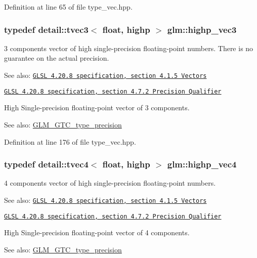 Definition at line 65 of file type\_\-vec.hpp.\hypertarget{group__core__precision_g4879124da7a18d6b681d933cb8c4267d}{
\subsubsection[highp\_\-vec3]{\setlength{\rightskip}{0pt plus 5cm}typedef detail::tvec3$<$ float, highp $>$ {\bf glm::highp\_\-vec3}}}
\label{group__core__precision_g4879124da7a18d6b681d933cb8c4267d}


3 components vector of high single-precision floating-point numbers. There is no guarantee on the actual precision.

\begin{Desc}
\item[See also:]\href{http://www.opengl.org/registry/doc/GLSLangSpec.4.20.8.pdf}{\tt GLSL 4.20.8 specification, section 4.1.5 Vectors} 

\href{http://www.opengl.org/registry/doc/GLSLangSpec.4.20.8.pdf}{\tt GLSL 4.20.8 specification, section 4.7.2 Precision Qualifier}\end{Desc}
High Single-precision floating-point vector of 3 components. \begin{Desc}
\item[See also:]\hyperlink{group__gtc__type__precision}{GLM\_\-GTC\_\-type\_\-precision} \end{Desc}


Definition at line 176 of file type\_\-vec.hpp.\hypertarget{group__core__precision_ge32d5f99860247afbe7ed90564bceac1}{
\subsubsection[highp\_\-vec4]{\setlength{\rightskip}{0pt plus 5cm}typedef detail::tvec4$<$ float, highp $>$ {\bf glm::highp\_\-vec4}}}
\label{group__core__precision_ge32d5f99860247afbe7ed90564bceac1}


4 components vector of high single-precision floating-point numbers.

\begin{Desc}
\item[See also:]\href{http://www.opengl.org/registry/doc/GLSLangSpec.4.20.8.pdf}{\tt GLSL 4.20.8 specification, section 4.1.5 Vectors} 

\href{http://www.opengl.org/registry/doc/GLSLangSpec.4.20.8.pdf}{\tt GLSL 4.20.8 specification, section 4.7.2 Precision Qualifier}\end{Desc}
High Single-precision floating-point vector of 4 components. \begin{Desc}
\item[See also:]\hyperlink{group__gtc__type__precision}{GLM\_\-GTC\_\-type\_\-precision} \end{Desc}


